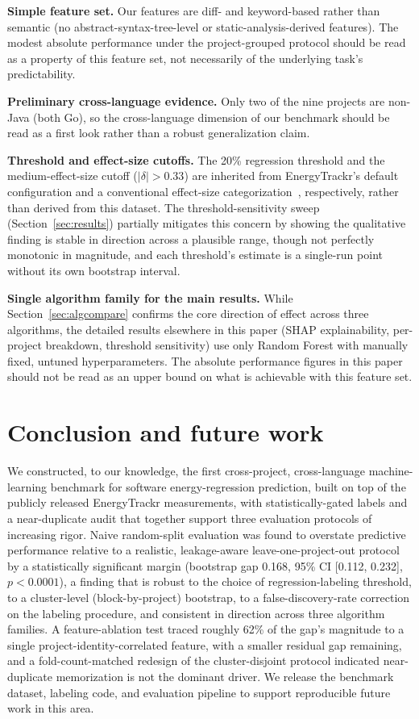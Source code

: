 \documentclass[preprint,12pt]{elsarticle}
\begin{document}
\textbf{Simple feature set.} Our features are diff- and keyword-based rather than semantic (no abstract-syntax-tree-level or static-analysis-derived features). The modest absolute performance under the project-grouped protocol should be read as a property of this feature set, not necessarily of the underlying task's predictability.

\textbf{Preliminary cross-language evidence.} Only two of the nine projects are non-Java (both Go), so the cross-language dimension of our benchmark should be read as a first look rather than a robust generalization claim.

\textbf{Threshold and effect-size cutoffs.} The 20\% regression threshold and the medium-effect-size cutoff ($|\delta|>0.33$) are inherited from EnergyTrackr's default configuration and a conventional effect-size categorization~\citep{romano2006exploring}, respectively, rather than derived from this dataset. The threshold-sensitivity sweep (Section~\ref{sec:results}) partially mitigates this concern by showing the qualitative finding is stable in direction across a plausible range, though not perfectly monotonic in magnitude, and each threshold's estimate is a single-run point without its own bootstrap interval.

\textbf{Single algorithm family for the main results.} While Section~\ref{sec:algcompare} confirms the core direction of effect across three algorithms, the detailed results elsewhere in this paper (SHAP explainability, per-project breakdown, threshold sensitivity) use only Random Forest with manually fixed, untuned hyperparameters. The absolute performance figures in this paper should not be read as an upper bound on what is achievable with this feature set.

\section{Conclusion and future work}
\label{sec:conclusion}

We constructed, to our knowledge, the first cross-project, cross-language machine-learning benchmark for software energy-regression prediction, built on top of the publicly released EnergyTrackr measurements, with statistically-gated labels and a near-duplicate audit that together support three evaluation protocols of increasing rigor. Naive random-split evaluation was found to overstate predictive performance relative to a realistic, leakage-aware leave-one-project-out protocol by a statistically significant margin (bootstrap gap 0.168, 95\% CI [0.112, 0.232], $p<0.0001$), a finding that is robust to the choice of regression-labeling threshold, to a cluster-level (block-by-project) bootstrap, to a false-discovery-rate correction on the labeling procedure, and consistent in direction across three algorithm families. A feature-ablation test traced roughly 62\% of the gap's magnitude to a single project-identity-correlated feature, with a smaller residual gap remaining, and a fold-count-matched redesign of the cluster-disjoint protocol indicated near-duplicate memorization is not the dominant driver. We release the benchmark dataset, labeling code, and evaluation pipeline to support reproducible future work in this area.
\end{document}

